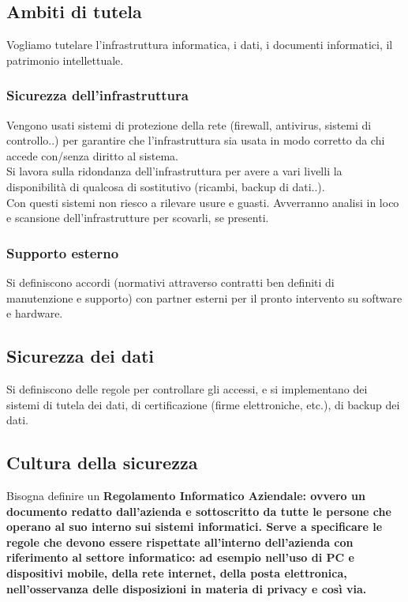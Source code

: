 \subsection{Ambiti di tutela}

Vogliamo tutelare l'infrastruttura informatica, i dati, i documenti
informatici, il patrimonio intellettuale.

\subsubsection{Sicurezza dell'infrastruttura}

Vengono usati sistemi di protezione della rete (firewall, antivirus,
sistemi di controllo..) per garantire che l'infrastruttura sia usata in
modo corretto da chi accede con/senza diritto al sistema.\\
Si lavora sulla ridondanza dell'infrastruttura per avere a vari livelli
la disponibilit\`a di qualcosa di sostitutivo (ricambi, backup di dati..).\\
Con questi sistemi non riesco a rilevare usure e guasti. Avverranno
analisi in loco e scansione dell'infrastrutture per scovarli, se
presenti.

\subsubsection{Supporto esterno}

Si definiscono accordi (normativi attraverso contratti ben definiti di
manutenzione e supporto) con partner esterni per il pronto intervento su
software e hardware.

\subsection{Sicurezza dei dati}

Si definiscono delle regole per controllare gli accessi, e si implementano dei
sistemi di tutela dei dati, di certificazione (firme elettroniche, etc.), di
backup dei dati.

\subsection{Cultura della sicurezza}

Bisogna definire un \bf Regolamento Informatico Aziendale\rm: ovvero un documento
redatto dall'azienda e sottoscritto da tutte le persone che operano al suo
interno sui sistemi informatici. Serve a specificare le regole che devono
essere rispettate all'interno dell'azienda con riferimento al settore
informatico: ad esempio nell'uso di PC e dispositivi mobile, della rete internet, della posta elettronica, nell'osservanza delle disposizioni in materia di privacy e cos\`i via.

